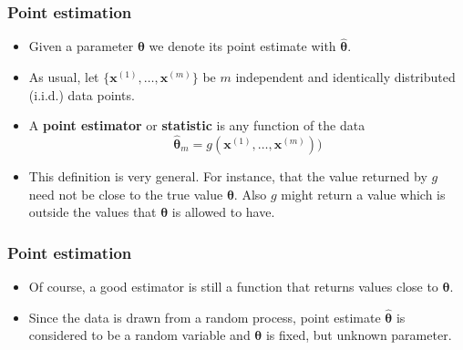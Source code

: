 \documentclass[notes]{beamer}          %
\newcommand{\vect}[1]{\bm{#1}}
\newif\iffull
\begin{document}
\begin{frame}
\frametitle{Point estimation}
    \begin{itemize}
        \item Given a parameter $\vect{\theta}$ we denote its point estimate with ${\vect{\hat{\theta}}}$.
        \item As usual, let $\{\vect{x}^{(1)}, \ldots, \vect{x}^{(m)} \}$ be $m$ independent and identically distributed (i.i.d.) data points.
        \item A {\bf point estimator} or {\bf statistic} is any function of the data
        $$
        \hat{\vect{\theta}}_m = g(\vect{x}^{(1)}, \ldots, \vect{x}^{(m)}))
        $$
        \item This definition is very general. For instance, that the value returned by $g$ need not be close to the true value $\vect{\theta}$. Also $g$ might return a value which is outside the values that $\vect{\theta}$ is allowed to have.

    \end{itemize}
\end{frame}


\begin{frame}
\frametitle{Point estimation}
    \begin{itemize}
     \item Of course, a good estimator is still a function that returns values close to $\vect{\theta}$.
    \item Since the data is drawn from a random process, point estimate $\vect{\hat\theta}$ is considered to be a random variable and $\vect{\theta}$ is fixed, but unknown parameter.
    \end{itemize}
\end{frame}

\iffull
\begin{frame}
\frametitle{Function estimation}
    \begin{itemize}
         \item In {\bf function estimation}, we assume that there is a (true) function that describes the (approximate) relationship between $\vect{x}$ and $\vect{y}$
        $$\vect{y} = f(\vect{x}) + \vect{\epsilon}$$
        where $\vect{\epsilon}$ is the part of $\vect{y}$ which is not predictable from $\vect{x}$
        \item The goal is to find the {\bf function estimate} ({\bf model}) $\hat{f}$ which is a good approximation of $f$.
        \item The linear regression and polynomial regression can be seen both illustrate scenarios that can be interpreted as either estimating a parameter $\vect{w}$ or estimating a function $\hat{f}$.
    \end{itemize}
\end{frame}
\fi
\end{document}
